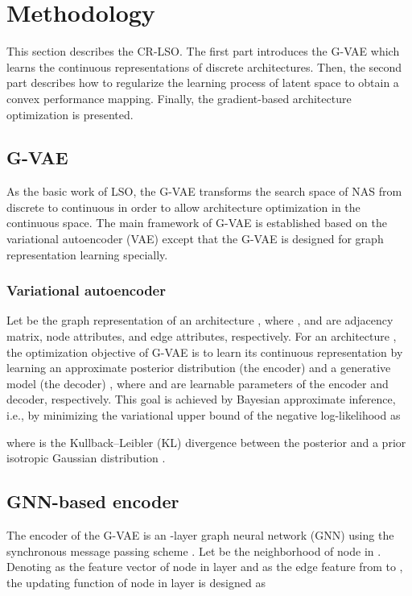 \documentclass[10pt,twocolumn,letterpaper]{article}
\begin{document}
\section{Methodology}
This section describes the CR-LSO. The first part introduces the G-VAE which learns the continuous representations of discrete architectures. Then, the second part describes how to regularize the learning process of latent space to obtain a convex performance mapping. Finally, the gradient-based architecture optimization is presented.
\subsection{G-VAE}
As the basic work of LSO, the G-VAE transforms the search space of NAS from discrete to continuous in order to allow architecture optimization in the continuous space. The main framework of G-VAE is established based on the variational autoencoder (VAE) \cite{kingma2013auto, doersch2016tutorial} except that the G-VAE is designed for graph representation learning specially.

\subsubsection{Variational autoencoder}
Let  be the graph representation of an architecture , where ,  and  are adjacency matrix, node attributes, and edge attributes, respectively. For an architecture , the optimization objective of G-VAE is to learn its continuous representation  by learning an approximate posterior distribution  (the encoder) and a generative model (the decoder) , where  and  are learnable parameters of the encoder and decoder, respectively. This goal is achieved by Bayesian approximate inference, i.e., by minimizing the variational upper bound of the negative log-likelihood  as 

where  is the Kullback–Leibler (KL) divergence between the posterior  and a prior isotropic Gaussian distribution . 

\subsection{GNN-based encoder} 
The encoder of the G-VAE is an -layer graph neural network (GNN) using the synchronous message passing scheme \cite{fey2019fast}. Let  be the neighborhood of node  in . Denoting  as the feature vector of node  in layer  and  as the edge feature from  to , the updating function of node  in layer  is designed as
\end{document}
